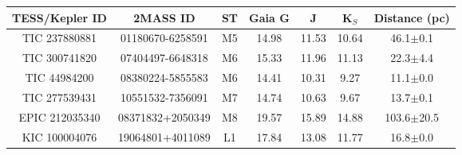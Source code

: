 \begin{tabular}{ccccccc}
\hline\hline
TESS/Kepler ID & 2MASS ID & ST & Gaia G & J & K$_S$ & Distance (pc) \\
\hline
TIC 237880881&01180670-6258591 & M5 & 14.98 & 11.53 & 10.64 & 46.1$\pm$0.1 \\
TIC 300741820&07404497-6648318 & M6 & 15.33 & 11.96 & 11.13 & 22.3$\pm$4.4 \\
TIC 44984200&08380224-5855583 & M6 & 14.41 & 10.31 & 9.27 & 11.1$\pm$0.0 \\
TIC 277539431&10551532-7356091 & M7 & 14.74 & 10.63 & 9.67 & 13.7$\pm$0.1 \\
EPIC 212035340&08371832+2050349 & M8 & 19.57 & 15.89 & 14.88 & 103.6$\pm$20.5 \\
KIC 100004076&19064801+4011089 & L1 & 17.84 & 13.08 & 11.77 & 16.8$\pm$0.0 \\
\hline
\end{tabular}

